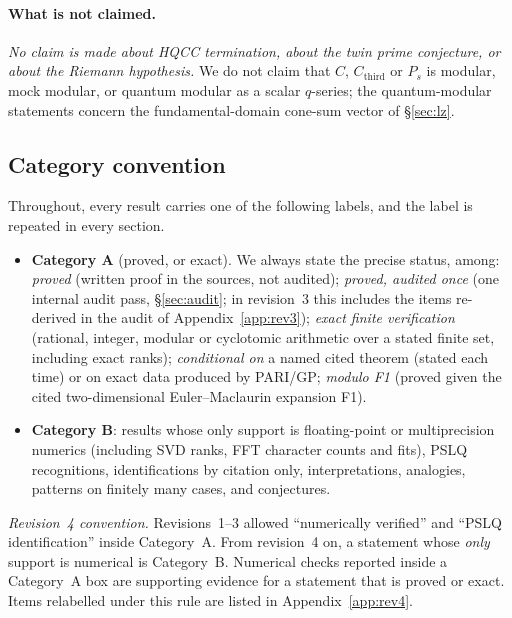 \documentclass[11pt]{article}
\theoremstyle{definition}
\newcommand{\Cthird}{C_{\mathrm{third}}}
\begin{document}
\paragraph{What is not claimed.} \emph{No claim is made about HQCC termination, about the twin prime
conjecture, or about the Riemann hypothesis.} We do not claim that $C$, $\Cthird$ or $P_s$ is modular,
mock modular, or quantum modular as a scalar $q$-series; the quantum-modular statements concern the
fundamental-domain cone-sum vector of \S\ref{sec:lz}.

\subsection{Category convention}\label{sec:cat}
Throughout, every result carries one of the following labels, and the label is repeated in every section.
\begin{itemize}[leftmargin=2em]
\item \textbf{Category A} (proved, or exact). We always state the precise status, among:
\emph{proved} (written proof in the sources, not audited); \emph{proved, audited once} (one internal audit
pass, \S\ref{sec:audit}; in revision~3 this includes the items re-derived in the audit of Appendix~\ref{app:rev3}); \emph{exact finite verification}
(rational, integer, modular or cyclotomic arithmetic over a stated finite set, including exact ranks); \emph{conditional on} a named cited theorem
(stated each time) or on exact data produced by PARI/GP; \emph{modulo F1} (proved given the cited two-dimensional Euler--Maclaurin expansion F1).
\item \textbf{Category B}: results whose only support is floating-point or multiprecision numerics (including SVD ranks, FFT character counts and
fits), PSLQ recognitions, identifications by citation only, interpretations, analogies, patterns on finitely many cases, and conjectures.
\end{itemize}
\emph{Revision~4 convention.} Revisions~1--3 allowed ``numerically verified'' and ``PSLQ identification'' inside Category~A. From revision~4 on, a
statement whose \emph{only} support is numerical is Category~B. Numerical checks reported inside a Category~A box are supporting evidence for a
statement that is proved or exact. Items relabelled under this rule are listed in Appendix~\ref{app:rev4}.
\end{document}
